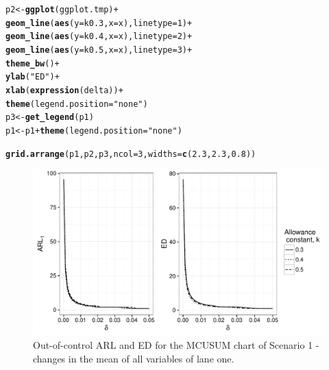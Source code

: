 \documentclass[a4paper,11pt,fleqn,twoside,notitlepage]{report}
\makeatletter
\def\maxwidth{ %
  \ifdim\Gin@nat@width>\linewidth
    \linewidth
  \else
    \Gin@nat@width
  \fi
}
\newcommand{\hlnum}[1]{\textcolor[rgb]{0.686,0.059,0.569}{#1}}%
\newcommand{\hlstr}[1]{\textcolor[rgb]{0.192,0.494,0.8}{#1}}%
\newcommand{\hlopt}[1]{\textcolor[rgb]{0,0,0}{#1}}%
\newcommand{\hlstd}[1]{\textcolor[rgb]{0.345,0.345,0.345}{#1}}%
\newcommand{\hlkwb}[1]{\textcolor[rgb]{0.69,0.353,0.396}{#1}}%
\newcommand{\hlkwc}[1]{\textcolor[rgb]{0.333,0.667,0.333}{#1}}%
\newcommand{\hlkwd}[1]{\textcolor[rgb]{0.737,0.353,0.396}{\textbf{#1}}}%
\newenvironment{kframe}{%
 \def\at@end@of@kframe{}%
 \ifinner\ifhmode%
  \def\at@end@of@kframe{\end{minipage}}%
  \begin{minipage}{\columnwidth}%
 \fi\fi%
 \def\FrameCommand##1{\hskip\@totalleftmargin \hskip-\fboxsep
 \colorbox{shadecolor}{##1}\hskip-\fboxsep
     \hskip-\linewidth \hskip-\@totalleftmargin \hskip\columnwidth}%
 \MakeFramed {\advance\hsize-\width
   \@totalleftmargin\z@ \linewidth\hsize
   \@setminipage}}%
 {\par\unskip\endMakeFramed%
 \at@end@of@kframe}
\newenvironment{knitrout}{}{} %
\makeatother
\begin{document}
\begin{knitrout}
\begin{kframe}
\begin{alltt}
\hlstd{p2} \hlkwb{<-} \hlkwd{ggplot}\hlstd{(ggplot.tmp)} \hlopt{+}
  \hlkwd{geom_line}\hlstd{(}\hlkwd{aes}\hlstd{(}\hlkwc{y}\hlstd{=k0.3,}\hlkwc{x}\hlstd{=x),} \hlkwc{linetype}\hlstd{=}\hlnum{1}\hlstd{)} \hlopt{+}
  \hlkwd{geom_line}\hlstd{(}\hlkwd{aes}\hlstd{(}\hlkwc{y}\hlstd{=k0.4,}\hlkwc{x}\hlstd{=x),} \hlkwc{linetype}\hlstd{=}\hlnum{2}\hlstd{)} \hlopt{+}
  \hlkwd{geom_line}\hlstd{(}\hlkwd{aes}\hlstd{(}\hlkwc{y}\hlstd{=k0.5,}\hlkwc{x}\hlstd{=x),} \hlkwc{linetype}\hlstd{=}\hlnum{3}\hlstd{)} \hlopt{+}
  \hlkwd{theme_bw}\hlstd{()} \hlopt{+}
  \hlkwd{ylab}\hlstd{(}\hlstr{"ED"}\hlstd{)} \hlopt{+}
  \hlkwd{xlab}\hlstd{(}\hlkwd{expression}\hlstd{(delta))} \hlopt{+}
  \hlkwd{theme}\hlstd{(}\hlkwc{legend.position}\hlstd{=}\hlstr{"none"}\hlstd{)}
\hlstd{p3} \hlkwb{<-} \hlkwd{get_legend}\hlstd{(p1)}
\hlstd{p1} \hlkwb{<-} \hlstd{p1} \hlopt{+} \hlkwd{theme}\hlstd{(}\hlkwc{legend.position}\hlstd{=}\hlstr{"none"}\hlstd{)}

\hlkwd{grid.arrange}\hlstd{(p1,p2,p3,} \hlkwc{ncol}\hlstd{=}\hlnum{3}\hlstd{,} \hlkwc{widths}\hlstd{=}\hlkwd{c}\hlstd{(}\hlnum{2.3}\hlstd{,} \hlnum{2.3}\hlstd{,} \hlnum{0.8}\hlstd{))}
\end{alltt}
\end{kframe}\begin{figure}
\includegraphics[width=\maxwidth]{figure/ARL1MeanCase1-1} \caption[Out-of-control ARL and ED for the MCUSUM chart of Scenario 1 - changes in the mean of all variables of lane one]{Out-of-control ARL and ED for the MCUSUM chart of Scenario 1 - changes in the mean of all variables of lane one.}\label{fig:ARL1MeanCase1}
\end{figure}


\end{knitrout}
\end{document}
